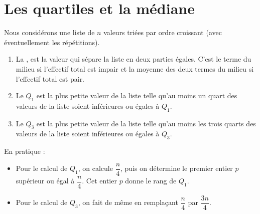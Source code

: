 \section{Les quartiles et la médiane}

\begin{definition}
    Nous considérons une liste de \( n\) valeurs triées par ordre croissant (avec éventuellement les répétitions).
    \begin{enumerate}
        \item
            La , est la valeur qui sépare la liste en deux parties égales. C'est le terme du milieu si l'effectif total est impair et la moyenne des deux termes du milieu si l'effectif total est pair.
      \item 
          Le  $Q_1$ est la plus petite valeur de la liste telle qu'au moins un quart des valeurs de la liste soient inférieures ou égales à $Q_1$.
        \item
            Le  $Q_3$ est la plus petite valeur de la liste telle qu'au moins les trois quarts des valeurs de la liste soient inférieures ou égales à $Q_3$.
  \end{enumerate}
\end{definition}
En pratique :
\begin{itemize}
    \item 
  Pour le calcul de $Q_1$, on calcule $\dfrac{n}4$, puis on détermine le premier entier $p$ supérieur ou égal à $\dfrac{n}4$. Cet entier $p$ donne le rang de $Q_1$. 
  \item
  Pour le calcul de $Q_3$, on fait de même en remplaçant $\dfrac{n}4$ par $\dfrac{3n}4$. 
\end{itemize}


